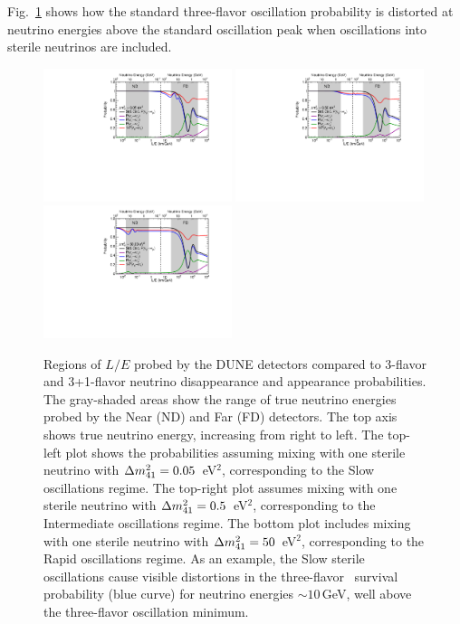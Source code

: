 Fig.~\ref{fig:regimes} shows how the standard three-flavor oscillation probability is distorted at neutrino energies above the standard oscillation peak when oscillations into sterile neutrinos are included.
\begin{figure}[!h]
	\vspace{0pt}
	\begin{center}
	  	\includegraphics[width=0.49\textwidth]{graphics/DUNE_SterileSensi_dm0_05.pdf}
        \includegraphics[width=0.49\textwidth]{graphics/DUNE_SterileSensi_dm0_5.pdf}
        \includegraphics[width=0.49\textwidth]{graphics/DUNE_SterileSensi_dm50.pdf}
	\end{center}
\vspace{0pt}
\caption{Regions of $L/E$ probed by the DUNE detectors compared to 3-flavor and 3+1-flavor neutrino disappearance and appearance probabilities. The gray-shaded areas show the range of true neutrino energies probed by the Near (ND) and Far (FD) detectors. The top axis shows true neutrino energy, increasing from right to left. The top-left plot shows the probabilities assuming mixing with one sterile neutrino with $\Delta m^2_{\rm{41}}=0.05$~eV$^2$, corresponding to the Slow oscillations regime. The top-right plot assumes mixing with one sterile neutrino with $\Delta m^2_{\rm{41}}=0.5$~eV$^2$, corresponding to the Intermediate oscillations regime. The bottom plot includes mixing with one sterile neutrino with $\Delta m^2_{\rm{41}}=50$~eV$^2$, corresponding to the Rapid oscillations regime. As an example, the Slow sterile oscillations cause visible distortions in the three-flavor \numu~survival probability (blue curve) for neutrino energies $\sim10$\,GeV, well above the three-flavor oscillation minimum.}
  \label{fig:regimes}
 \vspace{0pt}
\end{figure}

